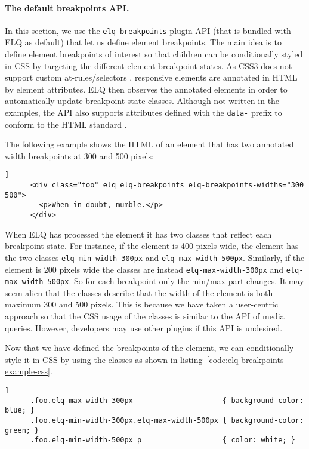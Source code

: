 \documentclass[]{llncs}
\newcommand{\code}[1]{\texttt{#1}}
\newcommand{\elq}{ELQ}
\begin{document}
  \paragraph{The default breakpoints API.}
    In this section, we use the \code{elq-breakpoints} plugin API (that is bundled with \elq{} as default) that let us define element breakpoints.
    The main idea is to define element breakpoints of interest so that children can be conditionally styled in CSS by targeting the different element breakpoint states.
    As CSS3 does not support custom at-rules/selectors \cite{w3c_css_selectors}, responsive elements are annotated in HTML by element attributes.
    \elq{} then observes the annotated elements in order to automatically update breakpoint state classes.
    Although not written in the examples, the API also supports attributes defined with the \code{data-} prefix to conform to the HTML standard \cite{html-spec}.

    The following example shows the HTML of an element that has two annotated width breakpoints at 300 and 500 pixels:

    \begin{lstlisting}[gobble=6,caption={},captionpos=b,label={}]]
      <div class="foo" elq elq-breakpoints elq-breakpoints-widths="300 500">
        <p>When in doubt, mumble.</p>
      </div>
    \end{lstlisting}

    \noindent
    When \elq{} has processed the element it has two classes that reflect each breakpoint state.
    For instance, if the element is 400 pixels wide, the element has the two classes \code{elq-min-width-300px} and \code{elq-max-width-500px}.
    Similarly, if the element is 200 pixels wide the classes are instead \code{elq-max-width-300px} and \code{elq-max-width-500px}.
    So for each breakpoint only the min/max part changes.
    It may seem alien that the classes describe that the width of the element is both maximum 300 and 500 pixels.
    This is because we have taken a user-centric approach so that the CSS usage of the classes is similar to the API of media queries.
    However, developers may use other plugins if this API is undesired.

    Now that we have defined the breakpoints of the element, we can conditionally style it in CSS by using the classes as shown in listing~\ref{code:elq-breakpoints-example-css}.

    \begin{lstlisting}[gobble=6,caption={Example usage of the breakpoint state classes in CSS.},captionpos=b,label={code:elq-breakpoints-example-css}]]
      .foo.elq-max-width-300px                     { background-color: blue; }
      .foo.elq-min-width-300px.elq-max-width-500px { background-color: green; }
      .foo.elq-min-width-500px p                   { color: white; }
    \end{lstlisting}
\end{document}
